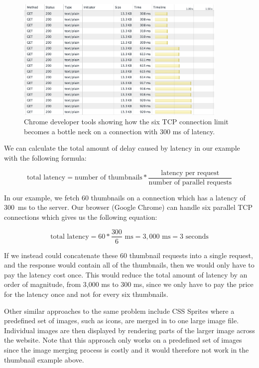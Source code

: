 \documentclass{cslthse-msc}
\begin{document}
\begin{figure}[H]
  \centering
    \begin{center}
      \includegraphics[width=0.9\textwidth]{images/chrome_latency_limit.png}
    \end{center}
  \caption{Chrome developer tools showing how the six TCP connection limit becomes a bottle neck on a connection with 300 ms of latency.}
  \label{fig:tcp_bottleneck}
\end{figure}

We can calculate the total amount of delay caused by latency in our example with the following formula:

\begin{equation}
\mbox{total latency} = \mbox{number of thumbnails} * \frac{\mbox{latency per request}}{\mbox{number of parallel requests}}
\end{equation}

In our example, we fetch 60 thumbnails on a connection which has a latency of 300~ms to the server. Our browser (Google Chrome) can handle six parallel TCP connections which gives us the following equation:

\begin{equation}
\mbox{total latency} = 60 * \frac{300}{6} \mbox{ ms}= 3,000 \mbox{ ms} = 3 \mbox{ seconds}
\end{equation}

If we instead could concatenate these 60 thumbnail requests into a single request, and the response would contain all of the thumbnails, then we would only have to pay the latency cost once. This would reduce the total amount of latency by an order of magnitude, from 3,000 ms to 300 ms, since we only have to pay the price for the latency once and not for every six thumbnails.

Other similar approaches to the same problem include CSS Sprites \cite{css_sprites} where a predefined set of images, such as icons, are merged in to one large image file. Individual images are then displayed by rendering parts of the larger image across the website. Note that this approach only works on a predefined set of images since the image merging process is costly and it would therefore not work in the thumbnail example above.
\end{document}
